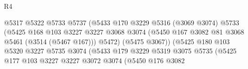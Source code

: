 \begin{lexlean}{R4}
\begin{coremodule}
                                            @5317
                                            @5322
                                            @5733
                                            @5737
                                            (@5433
                                              @170
                                              @3229
                                              @5316
                                              (@3069 @3074)
                                              @5733
                                              (@5425
                                                @168
                                                @103
                                                @3227
                                                @3227
                                                @3068
                                                @3074
                                                (@5450
                                                  @167
                                                  @3082
                                                  @81
                                                  @3068
                                                  @5461
                                                  (@3514 (@5467 @167)))
                                                @5472)
                                              (@5475 @3067))
                                            (@5425
                                              @180
                                              @103
                                              @5320
                                              @3227
                                              @5735
                                              @3074
                                              (@5433
                                                @179
                                                @3229
                                                @5319
                                                @3075
                                                @5735
                                                (@5425
                                                  @177
                                                  @103
                                                  @3227
                                                  @3227
                                                  @3072
                                                  @3074
                                                  (@5450
                                                    @176
                                                    @3082

\end{coremodule}
\end{lexlean}
